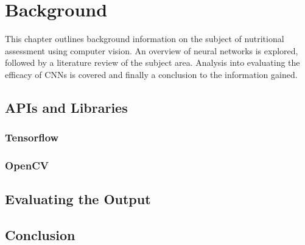 \chapter{Background}
\label{background}

This chapter outlines background information on the subject of nutritional assessment using computer vision.
An overview of neural networks is explored, followed by a literature review of the subject area.
Analysis into evaluating the efficacy of CNNs is covered and finally a conclusion to the information gained.













\section{APIs and Libraries}
\subsection*{Tensorflow}


\subsection*{OpenCV}


% 

% 

\section{Evaluating the Output}


\section{Conclusion}


